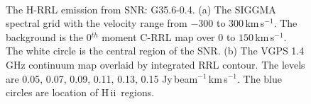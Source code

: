 \documentclass[manuscript]{aastex61}
\newcommand{\hii}{{\rm H\,}{{\sc ii}}}
\newcommand{\kms}{\,km\,s$^{-1}$}
\begin{document}
\begin{figure}[H]
\centering
{}
\\
\caption{The H-RRL emission from SNR: G35.6-0.4.
          (a) The SIGGMA spectral grid with the velocity range from $-300$ to $300$\kms.
	  The background is the 0$^{th}$ moment C-RRL map over $0$ to $150$\kms.
	  The white circle is the central region of the SNR.
	  (b) The VGPS 1.4 GHz continuum map overlaid by integrated RRL contour.
	  The levels are 0.05, 0.07, 0.09, 0.11, 0.13, 0.15 Jy\,beam$^{-1}$\kms.
	  The blue circles are location of \hii\ regions.
	  }
\label{fig_snr-g356}
\end{figure}
\end{document}
